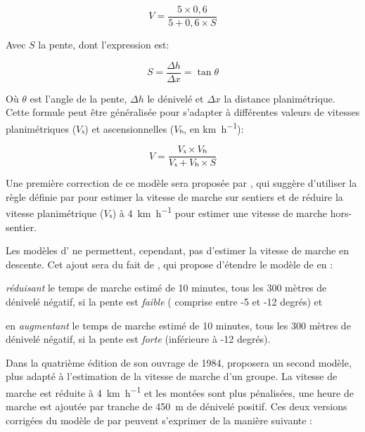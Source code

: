 \begin{equation}
  \label{eq:marche_naismith}
  V = \dfrac{5 × 0,6}{5 + 0,6 × S}
\end{equation}

Avec \(S\) la pente, dont l'expression est:

\begin{equation}
 S = \dfrac{Δh}{Δx} = \tan θ
\end{equation}

Où \(θ\) est l'angle de la pente, \(Δh\) le dénivelé et \(Δx\) la
distance planimétrique. Cette formule peut être généralisée pour
s'adapter à différentes valeurs de vitesses planimétriques (\(Vₓ\)) et
ascensionnelles (\(Vₕ\), en \si{\kilo\meter\per\hour}):

\begin{equation}
  \label{eq:marche_naismith_f}
  V = \dfrac{Vₓ × Vₕ}{Vₓ + Vₕ × S}
\end{equation}

Une première correction de ce modèle sera proposée par
\textcite{Aitken1977}, qui suggère d'utiliser la règle définie par
\autocite{Naismith1892} pour estimer la vitesse de marche sur sentiers
et de réduire la vitesse planimétrique (\(Vₓ\)) à
\SI{4}{\kilo\meter\per\hour} pour estimer une vitesse de marche
hors-sentier.

Les modèles d'\textcite{Naismith1892,Aitken1977} ne permettent,
cependant, pas d'estimer la vitesse de marche en descente. Cet ajout
sera du fait de \textcite{Langmuir1984}, qui propose d'étendre le
modèle de \textcite{Naismith1892} en :
%
\begin{enumerate*}[label=(\alph*)]
\item \emph{réduisant} le temps de marche estimé de 10 minutes, tous les
300 mètres de dénivelé négatif, si la pente est \emph{faible} (\ie
comprise entre -5 et -12 degrés) et
\item en \emph{augmentant} le temps de marche estimé de 10 minutes,
  tous les 300 mètres de dénivelé négatif, si la pente est
  \emph{forte} (\ie inférieure à -12 degrés).
\end{enumerate*}
%
Dans la quatrième édition de son ouvrage de 1984,
\textcite{Langmuir2013} proposera un second modèle, plus adapté à
l'estimation de la vitesse de marche d'un groupe. La vitesse de marche
est réduite à \SI{4}{\kilo\meter\per\hour} et les montées sont plus
pénalisées, une heure de marche est ajoutée par tranche de
\SI{450}{\meter} de dénivelé positif. Ces deux versions corrigées du
modèle de \autocite{Naismith1892} par \textcite{Langmuir1984,
  Langmuir2013} peuvent s'exprimer de la manière suivante :

